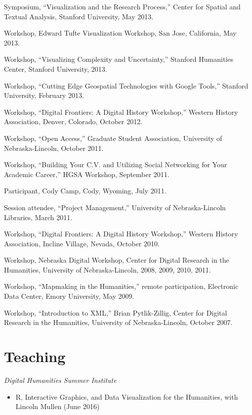 Symposium, ``Visualization and the Research Process,'' Center for
Spatial and Textual Analysis, Stanford University, May 2013.

Workshop, Edward Tufte Visualization Workshop, San Jose, California, May
2013.

Workshop, ``Visualizing Complexity and Uncertainty,'' Stanford
Humanities Center, Stanford University, 2013.

Workshop, ``Cutting Edge Geospatial Technologies with Google Tools,''
Stanford University, February 2013.

Workshop, ``Digital Frontiers: A Digital History Workshop,'' Western
History Association, Denver, Colorado, October 2012.

Workshop, ``Open Access,'' Graduate Student Association, University of
Nebraska-Lincoln, October 2011.

Workshop, ``Building Your C.V. and Utilizing Social Networking for Your
Academic Career,'' HGSA Workshop, September 2011.

Participant, Cody Camp, Cody, Wyoming, July 2011.

Session attendee, ``Project Management,'' University of Nebraska-Lincoln
Libraries, March 2011.

Workshop, ``Digital Frontiers: A Digital History Workshop,'' Western
History Association, Incline Village, Nevada, October 2010.

Workshop, Nebraska Digital Workshop, Center for Digital Research in the
Humanities, University of Nebraska-Lincoln, 2008, 2009, 2010, 2011.

Workshop, ``Mapmaking in the Humanities,'' remote participation,
Electronic Data Center, Emory University, May 2009.

Workshop, ``Introduction to XML,'' Brian Pytlik-Zillig, Center for
Digital Research in the Humanities, University of Nebraska-Lincoln,
October 2007.

\section{Teaching}\label{teaching}

\emph{Digital Humanities Summer Institute}

\begin{itemize}
\tightlist
\item
  R, Interactive Graphics, and Data Visualization for the Humanities,
  with Lincoln Mullen (June 2016)
\end{itemize}

